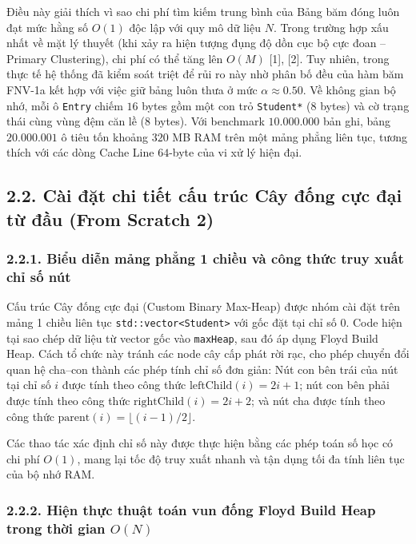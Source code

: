 \documentclass[14pt,a4paper]{extarticle}
\begin{document}
Điều này giải thích vì sao chi phí tìm kiếm trung bình của Bảng băm đóng luôn đạt mức hằng số $O(1)$ độc lập với quy mô dữ liệu $N$. Trong trường hợp xấu nhất về mặt lý thuyết (khi xảy ra hiện tượng đụng độ dồn cục bộ cực đoan -- Primary Clustering), chi phí có thể tăng lên $O(M)$ [1], [2]. Tuy nhiên, trong thực tế hệ thống đã kiểm soát triệt để rủi ro này nhờ phân bố đều của hàm băm FNV-1a kết hợp với việc giữ bảng luôn thưa ở mức $\alpha \approx 0.50$. Về không gian bộ nhớ, mỗi ô \texttt{Entry} chiếm $16$ bytes gồm một con trỏ \texttt{Student*} (8 bytes) và cờ trạng thái cùng vùng đệm căn lề (8 bytes). Với benchmark $10.000.000$ bản ghi, bảng $20.000.001$ ô tiêu tốn khoảng $320$ MB RAM trên một mảng phẳng liên tục, tương thích với các dòng Cache Line $64$-byte của vi xử lý hiện đại.

\subsection*{2.2. Cài đặt chi tiết cấu trúc Cây đống cực đại từ đầu (From Scratch 2)}
{}

\subsubsection*{2.2.1. Biểu diễn mảng phẳng 1 chiều và công thức truy xuất chỉ số nút}
{}

Cấu trúc Cây đống cực đại (Custom Binary Max-Heap) được nhóm cài đặt trên mảng 1 chiều liên tục \texttt{std::vector<Student>} với gốc đặt tại chỉ số $0$. Code hiện tại sao chép dữ liệu từ vector gốc vào \texttt{maxHeap}, sau đó áp dụng Floyd Build Heap. Cách tổ chức này tránh các node cây cấp phát rời rạc, cho phép chuyển đổi quan hệ cha--con thành các phép tính chỉ số đơn giản:
Nút con bên trái của nút tại chỉ số $i$ được tính theo công thức $\text{leftChild}(i) = 2i + 1$; nút con bên phải được tính theo công thức $\text{rightChild}(i) = 2i + 2$; và nút cha được tính theo công thức $\text{parent}(i) = \lfloor (i - 1) / 2 \rfloor$.

Các thao tác xác định chỉ số này được thực hiện bằng các phép toán số học có chi phí $O(1)$, mang lại tốc độ truy xuất nhanh và tận dụng tối đa tính liên tục của bộ nhớ RAM.

\subsubsection*{2.2.2. Hiện thực thuật toán vun đống Floyd Build Heap trong thời gian \texorpdfstring{$O(N)$}{O(N)}}
{}
\end{document}
